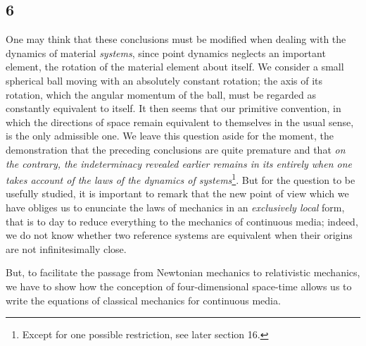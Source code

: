\subsection*{6}

One may think that these conclusions must be modified when dealing with the dynamics of material  \textit{systems}, since point dynamics neglects an important element, the rotation of the material element about itself. We consider a small spherical ball moving with an absolutely constant rotation; the axis of its rotation, which  the angular momentum of the ball, must be regarded as constantly equivalent to itself. It then seems that our primitive convention, in which the directions of space remain equivalent to themselves in the usual sense, is the only admissible one. We leave this question aside for the moment,  the demonstration that the preceding conclusions are quite premature and that \textit{on the contrary, the indeterminacy revealed earlier remains in its entirely when one takes account of the laws of the dynamics of systems}\footnote{Except for one possible restriction, see later section 16.}. But for the question to be usefully studied, it is important to remark that the new point of view which we have  obliges us to enunciate the laws of mechanics in an \textit{exclusively local} form, that is to day to reduce everything to the mechanics of continuous media; indeed, we do not know whether two reference systems are equivalent when their origins are not infinitesimally close.

But, to facilitate the passage from Newtonian mechanics to relativistic mechanics, we have to show how the conception of four-dimensional space-time allows us to write the equations of classical mechanics for continuous media.

